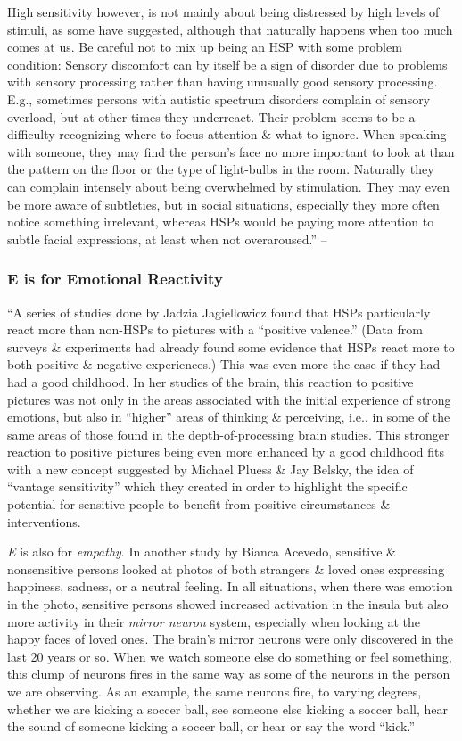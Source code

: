 \documentclass{article}
\numberwithin{equation}{section}
\begin{document}
High sensitivity however, is not mainly about being distressed by high levels of stimuli, as some have suggested, although that naturally happens when too much comes at us. Be careful not to mix up being an HSP with some problem condition: Sensory discomfort can by itself be a sign of disorder due to problems with sensory processing rather than having unusually good sensory processing. E.g., sometimes persons with autistic spectrum disorders complain of sensory overload, but at other times they underreact. Their problem seems to be a difficulty recognizing where to focus attention \& what to ignore. When speaking with someone, they may find the person's face no more important to look at than the pattern on the floor or the type of light-bulbs in the room. Naturally they can complain intensely about being overwhelmed by stimulation. They may even be more aware of subtleties, but in social situations, especially they more often notice something irrelevant, whereas HSPs would be paying more attention to subtle facial expressions, at least when not overaroused.'' -- \cite[pp. 19--21]{Aron2013}

\subsubsection*{E is for Emotional Reactivity}
``A series of studies done by Jadzia Jagiellowicz found that HSPs particularly react more than non-HSPs to pictures with a ``positive valence.'' (Data from surveys \& experiments had already found some evidence that HSPs react more to both positive \& negative experiences.) This was even more the case if they had had a good childhood. In her studies of the brain, this reaction to positive pictures was not only in the areas associated with the initial experience of strong emotions, but also in ``higher'' areas of thinking \& perceiving, i.e., in some of the same areas of those found in the depth-of-processing brain studies. This stronger reaction to positive pictures being even more enhanced by a good childhood fits with a new concept suggested by Michael Pluess \& Jay Belsky, the idea of ``vantage sensitivity'' which they created in order to highlight the specific potential for sensitive people to benefit from positive circumstances \& interventions.

\textit{E} is also for \textit{empathy}. In another study by Bianca Acevedo, sensitive \& nonsensitive persons looked at photos of both strangers \& loved ones expressing happiness, sadness, or a neutral feeling. In all situations, when there was emotion in the photo, sensitive persons showed increased activation in the insula but also more activity in their \textit{mirror neuron} system, especially when looking at the happy faces of loved ones. The brain's mirror neurons were only discovered in the last 20 years or so. When we watch someone else do something or feel something, this clump of neurons fires in the same way as some of the neurons in the person we are observing. As an example, the same neurons fire, to varying degrees, whether we are kicking a soccer ball, see someone else kicking a soccer ball, hear the sound of someone kicking a soccer ball, or hear or say the word ``kick.''
\end{document}
